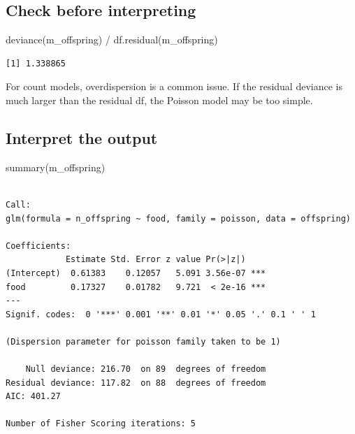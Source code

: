 \documentclass[
  letterpaper,
  8pt,
  a4paper]{book}
\newenvironment{Shaded}{\begin{snugshade}}{\end{snugshade}}
\newcommand{\FunctionTok}[1]{\textcolor[rgb]{0.28,0.35,0.67}{#1}}
\newcommand{\NormalTok}[1]{\textcolor[rgb]{0.00,0.23,0.31}{#1}}
\newcommand{\SpecialCharTok}[1]{\textcolor[rgb]{0.37,0.37,0.37}{#1}}
\begin{document}
\subsection*{Check before
interpreting}\label{check-before-interpreting-1}

\begin{Shaded}
\begin{Highlighting}[]
\FunctionTok{deviance}\NormalTok{(m\_offspring) }\SpecialCharTok{/} \FunctionTok{df.residual}\NormalTok{(m\_offspring)}
\end{Highlighting}
\end{Shaded}

\begin{verbatim}
[1] 1.338865
\end{verbatim}

For count models, overdispersion is a common issue. If the residual
deviance is much larger than the residual df, the Poisson model may be
too simple.

\subsection*{Interpret the output}\label{interpret-the-output-2}

\begin{Shaded}
\begin{Highlighting}[]
\FunctionTok{summary}\NormalTok{(m\_offspring)}
\end{Highlighting}
\end{Shaded}

\begin{verbatim}

Call:
glm(formula = n_offspring ~ food, family = poisson, data = offspring)

Coefficients:
            Estimate Std. Error z value Pr(>|z|)    
(Intercept)  0.61383    0.12057   5.091 3.56e-07 ***
food         0.17327    0.01782   9.721  < 2e-16 ***
---
Signif. codes:  0 '***' 0.001 '**' 0.01 '*' 0.05 '.' 0.1 ' ' 1

(Dispersion parameter for poisson family taken to be 1)

    Null deviance: 216.70  on 89  degrees of freedom
Residual deviance: 117.82  on 88  degrees of freedom
AIC: 401.27

Number of Fisher Scoring iterations: 5
\end{verbatim}
\end{document}
